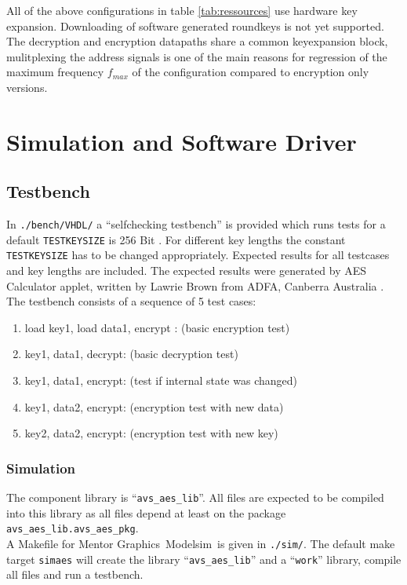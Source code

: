 \documentclass{ruschidoc}
\begin{document}
All of the above configurations in table \ref{tab:ressources} use hardware key
expansion. Downloading of software generated roundkeys is not yet supported. The
decryption and encryption datapaths share a common keyexpansion block, mulitplexing
the address signals is one of the main reasons for regression of the maximum
frequency $f_{max}$ of the configuration compared to encryption only versions. 

\section{Simulation and Software Driver}
\label{sec:simdriv}
\subsection{Testbench}
\label{sec:testbench}
In \texttt{./bench/VHDL/} a ``selfchecking testbench'' is provided which runs tests
for a default \texttt{TESTKEYSIZE} is 256 Bit . For different key lengths the
constant \texttt{TESTKEYSIZE} has to be changed appropriately. Expected results for
all testcases and key lengths are included. The expected results were generated by
AES Calculator applet, written by Lawrie Brown from ADFA, Canberra Australia \cite{LaBr05}.  The
testbench consists of a sequence of 5 test cases:
\begin{enumerate}
\item load key1, load data1, encrypt : (basic encryption test)
\item key1, data1, decrypt: (basic decryption test)
\item key1, data1, encrypt: (test if internal state was changed) 
\item key1, data2, encrypt: (encryption test with new data)
\item key2, data2, encrypt: (encryption test with new key) 
\end{enumerate}

\subsubsection{Simulation}
\label{sec:simulation}
The component library is ``\texttt{avs\_aes\_lib}''. All files are expected to be
compiled into this library as all files depend at least on the package
\texttt{avs\_aes\_lib.avs\_aes\_pkg}. \\
A Makefile for Mentor Graphics\rtm\ Modelsim\rtm\ is given in \texttt{./sim/}. The
default make target \texttt{simaes} will create the library
``\texttt{avs\_aes\_lib}'' and a ``\texttt{work}'' library, compile all files and run
a testbench. \\
\end{document}
